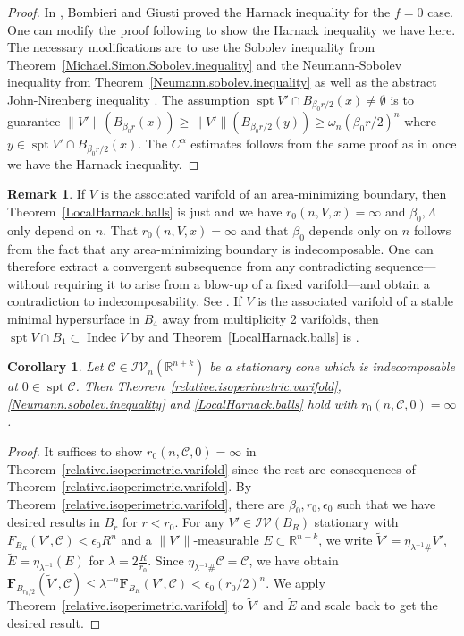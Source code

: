 \documentclass[11pt]{amsart}
\newtheorem{corollary}[theorem]{Corollary}
\theoremstyle{definition}
\newtheorem{remark}[theorem]{Remark}
\newcommand{\R}{\mathbb{R}}
\newcommand{\C}{\mathcal{C}}
\newcommand{\IV}{\mathcal{IV}}
\DeclareMathOperator{\spt}{spt}
\DeclareMathOperator{\indec}{Indec}
\begin{document}
\begin{proof}
	In \cite{bombieri1972harnack}, Bombieri and Giusti proved the Harnack inequality for the $f=0$ case. One can modify the proof following \cite[Theorem 8.17 and Theorem 8.18]{GT} to show the Harnack inequality we have here. The necessary modifications are to use the Sobolev inequality from Theorem~\ref{Michael.Simon.Sobolev.inequality} and the Neumann-Sobolev inequality from Theorem~\ref{Neumann.sobolev.inequality} as well as the abstract John-Nirenberg inequality \cite[Theorem 4]{bombieri1972harnack}. The assumption $\spt V'\cap B_{\beta_0 r/2}(x)\neq\emptyset$ is to guarantee $\|V'\|(B_{\beta_0 r}(x))\ge \|V'\|(B_{\beta_0 r/2}(y))\ge \omega_n (\beta_0 r/2)^n$ where $y\in \spt V'\cap B_{\beta_0 r/2}(x)$. The $C^\alpha$ estimates follows from the same proof as in \cite[Theorem 8.24]{GT} once we have the Harnack inequality.
\end{proof}
\begin{remark}\label{area.min.harnack}
    If $V$ is the associated varifold of an area-minimizing boundary, then  Theorem~\ref{LocalHarnack.balls} is just \cite[Theorem 5]{bombieri1972harnack} and we have $r_0(n,V,x)=\infty$  and $\beta_0,\Lambda$ only depend on $n$. That $r_0(n,V,x)=\infty$ and that $\beta_0$ depends only on $n$ follows from the fact that any area-minimizing boundary is indecomposable. One can therefore extract a convergent subsequence from any contradicting sequence---without requiring it to arise from a blow-up of a fixed varifold---and obtain a contradiction to indecomposability. See \cite[Theorem~2]{bombieri1972harnack}. If $V$ is the associated varifold of a stable minimal hypersurface in $B_4$ away from multiplicity 2 varifolds, then $\spt V\cap B_1\subset \indec V$ by \cite[Proposition~3.1]{Wang} and Theorem~\ref{LocalHarnack.balls} is \cite[Corollary~3.5]{Wang}.
\end{remark}
\begin{corollary}\label{cone.r_0=infty}
    Let $\C\in \IV_n(\R^{n+k})$ be a stationary cone which is indecomposable at $0\in \spt \C$. Then Theorem~\ref{relative.isoperimetric.varifold}, \ref{Neumann.sobolev.inequality} and \ref{LocalHarnack.balls} hold with $r_0(n,\C,0)=\infty$.
\end{corollary}
\begin{proof}It suffices to show $r_0(n,\C,0)=\infty$ in Theorem~\ref{relative.isoperimetric.varifold} since the rest are consequences of Theorem~\ref{relative.isoperimetric.varifold}. By Theorem~\ref{relative.isoperimetric.varifold}, there are $\beta_0,r_0,\epsilon_0$ such that we have desired results in $B_r$ for $r<r_0$. For any $V'\in \IV(B_R)$ stationary with $F_{B_R}(V',\C)<\epsilon_0 R^n$ and a $\|V'\|$-measurable $E\subset \R^{n+k}$, we write $\tilde V'=\eta_{\lambda^{-1}\#}V'$, $\tilde E=\eta_{\lambda^{-1}}(E)$ for $\lambda=2\frac{R}{r_0}$. Since $\eta_{\lambda^{-1}\#}\C=\C$, we have obtain $\mathbf{F}_{B_{r_0/2}}(\tilde V',\C)\le \lambda^{-n} \mathbf{F}_{B_R}(V',\C)<\epsilon_0(r_0/2)^n$. We apply Theorem~\ref{relative.isoperimetric.varifold} to $\tilde V'$ and $\tilde E$ and scale back to get the desired result.
\end{proof}
\end{document}
